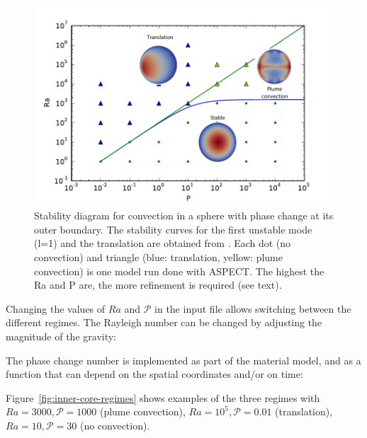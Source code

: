 \documentclass{article}
\begin{document}
\begin{figure}[h]
\begin{center}
\includegraphics[height=0.57\textwidth]{cookbooks/inner_core_convection/Diagstab.pdf}
	\caption{Stability diagram for convection in a sphere with phase change at its outer boundary. The stability curves for the first unstable mode (l=1) and the translation are obtained from \cite{Deguen2013}. Each dot (no convection) and triangle (blue: translation, yellow: plume convection) is one model run done with ASPECT. The highest the Ra and P are, the more refinement is required (see text).}
    \label{fig:diagramme-regime}
\end{center}
\end{figure}


Changing the values of $Ra$ and $\mathcal{P}$ in the input file allows switching between the different regimes.
The Rayleigh number can be changed by adjusting the magnitude of the gravity:

The phase change number is implemented as part of the material model, and as a function that can depend on the 
spatial coordinates and/or on time: 


Figure~\ref{fig:inner-core-regimes} shows examples of the three regimes with $Ra=3000, \mathcal{P}=1000$ (plume convection), 
$Ra=10^5, \mathcal{P}=0.01$ (translation), $Ra=10, \mathcal{P}=30$ (no convection).
\end{document}
